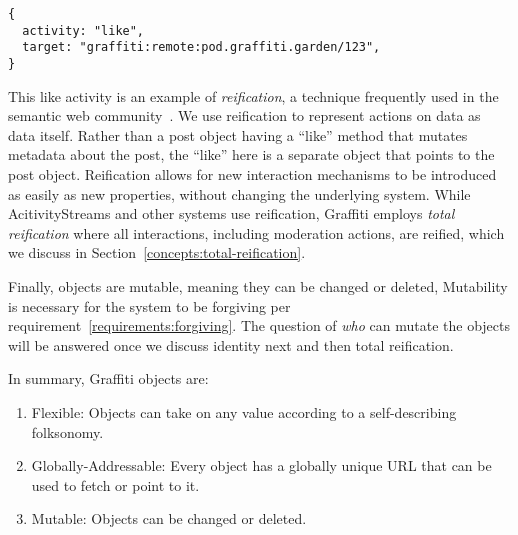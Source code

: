 
\begin{verbatim}
{
  activity: "like",
  target: "graffiti:remote:pod.graffiti.garden/123",
}
\end{verbatim}

This like activity is an example of \emph{reification},
a technique frequently used in the semantic web community~\cite{rdfprimer}.   We use reification to represent actions on data as data itself.
Rather than a post object having a ``like'' method that mutates metadata about the post,
the ``like'' here is a separate object that points to the post object.
Reification allows for new interaction mechanisms to be introduced as easily as new properties,
without changing the underlying system.
While AcitivityStreams and other systems use reification,
Graffiti employs \emph{total reification} where
all interactions, including moderation actions, are reified,
which we discuss in
Section~\ref{concepts:total-reification}.

Finally, objects are mutable, meaning they can be changed or deleted,
Mutability is necessary for the system to be forgiving per requirement~\ref{requirements:forgiving}.
The question of \emph{who} can mutate the objects
will be answered once we discuss identity next and then total reification.

In summary, Graffiti objects are:

\begin{enumerate}
\item
Flexible: Objects can take on any value according to a self-describing folksonomy.
\item
Globally-Addressable: Every object has a globally unique URL that can be used to fetch or point to it.
\item
Mutable: Objects can be changed or deleted.
\end{enumerate}

